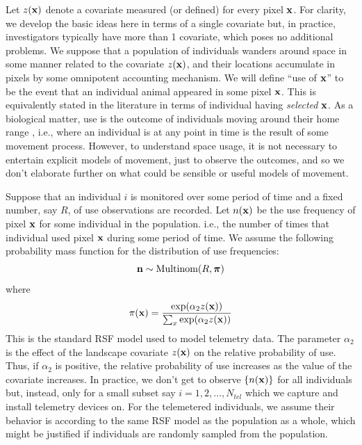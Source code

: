 \documentclass[12pt]{article}
\begin{document}
Let $z({\bf x})$ denote a covariate measured (or defined) for every
pixel ${\bf x}$. For clarity, we develop the basic ideas here in terms of a
single covariate but, in practice, investigators typically have more
than 1 covariate, which poses no additional problems.
We suppose that a population of individuals wanders around space in
some manner related to the covariate $z({\bf x})$, and their locations
accumulate in pixels by some omnipotent accounting mechanism. We will
define ``use of ${\bf x}$'' to be the event that an individual animal
appeared in some pixel ${\bf x}$.
This is equivalently stated in the
literature in terms of individual having {\it selected} ${\bf  x}$.
 As a biological matter,
use is the outcome of individuals moving around their home range \citep{hooten_etal:2010},
i.e., where an individual is at any point in time is the result of
some movement process. However, to understand space usage, it is not
necessary to entertain explicit models of movement, just to observe
the outcomes, and so we don't elaborate further on what could be
sensible or useful models of movement.

Suppose that an individual $i$ is monitored over some period of time
and a fixed number, say $R$, of use observations are recorded.
Let $n({\bf x})$ be the use frequency of pixel ${\bf x}$ for some individual
in the population.
i.e., the number of times that individual used pixel ${\bf x}$
during some period of time.  
We assume the
following probability mass function for the distribution of use
frequencies:
\[
{\bf n} \sim \mbox{Multinom}(R, {\bm \pi})
\]
where
\[
 \pi({\bf x}) = \frac{ \exp( \alpha_{2} z({\bf x}) ) }
   { \sum_{x}    \exp(\alpha_{2} z({\bf x})) }
\]
This is the standard RSF model \citep{manly_etal:2002} used to model
telemetry data.
The parameter $\alpha_2$ is the effect of the
landscape covariate $z({\bf x})$ on the relative probability of
use. Thus, if $\alpha_2$ is positive, the relative probability of use
increases as the value of the covariate increases.
In practice, we don't get to
observe $\{ n({\bf x}) \}$ for all individuals but, instead, only for a small
subset say $i=1,2,\ldots, N_{tel}$  which we capture and install telemetry devices on.
For the telemetered individuals, we assume their behavior is according
to the same RSF model as the population as a whole, which might be
justified if individuals are randomly sampled from the population.
\end{document}
